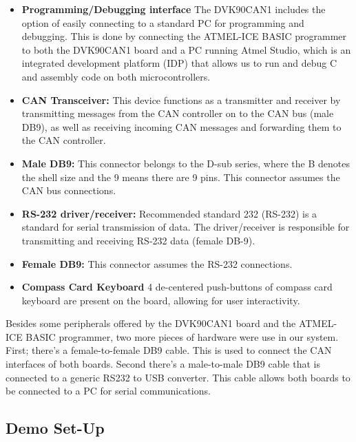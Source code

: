 \begin{itemize}
	\item \textbf{Programming/Debugging interface} The DVK90CAN1 includes the option of easily connecting to a standard PC for programming and debugging. This is done by connecting the ATMEL-ICE BASIC programmer to both the DVK90CAN1 board and a PC running Atmel Studio, which is an integrated development platform (IDP) that allows us to run and debug C and assembly code on both microcontrollers.
	
	\item \textbf{CAN Transceiver:} This device functions as a transmitter and receiver by transmitting messages from the CAN controller on to the CAN bus (male DB9), as well as receiving incoming CAN messages and forwarding them to the CAN controller. 
	
	\item \textbf{Male DB9:} This connector belongs to the D-sub series, where the B denotes the shell size and the 9 means there are 9 pins. This connector assumes the CAN bus connections.
	
	\item \textbf{RS-232 driver/receiver:} Recommended standard 232 (RS-232) is a standard for serial transmission of data. The driver/receiver is responsible for transmitting and receiving RS-232 data (female DB-9).
	
	\item \textbf{Female DB9:} This connector assumes the RS-232 connections.
	
	\item \textbf{Compass Card Keyboard} 4 de-centered push-buttons of compass card keyboard are present on the board, allowing for user interactivity.
\end{itemize}
Besides some peripherals offered by the DVK90CAN1 board and the ATMEL-ICE BASIC programmer, two more pieces of hardware were use in our system. First; there's a female-to-female DB9 cable. This is used to connect the CAN interfaces of both boards. Second there's a male-to-male DB9 cable that is connected to a generic RS232 to USB converter. This cable allows both boards to be connected to a PC for serial communications.

\subsection{Demo Set-Up}
\label{sec:demo_setup}

